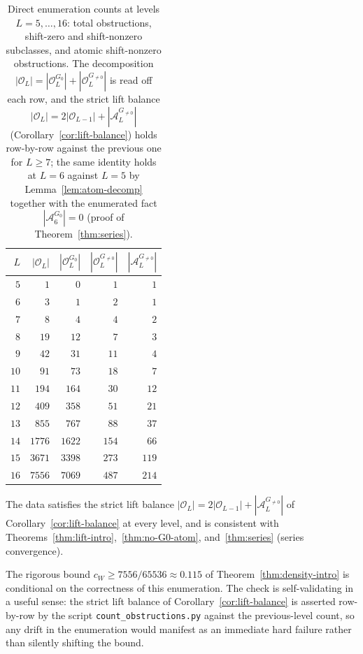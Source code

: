 \documentclass[11pt,reqno]{amsart}
\theoremstyle{plain}
\theoremstyle{definition}
\theoremstyle{remark}
\newcommand{\Obs}{\mathcal{O}}
\newcommand{\Atom}{\mathcal{A}}
\begin{document}
\begin{table}[h]
\centering
\begin{tabular}{rrrrr}
\toprule
$L$ & $|\Obs_L|$ & $|\Obs_L^{G_0}|$ & $|\Obs_L^{G_{\ne 0}}|$ & $|\Atom_L^{G_{\ne 0}}|$ \\
\midrule
$5$  & $1$    & $0$    & $1$   & $1$   \\
$6$  & $3$    & $1$    & $2$   & $1$   \\
$7$  & $8$    & $4$    & $4$   & $2$   \\
$8$  & $19$   & $12$   & $7$   & $3$   \\
$9$  & $42$   & $31$   & $11$  & $4$   \\
$10$ & $91$   & $73$   & $18$  & $7$   \\
$11$ & $194$  & $164$  & $30$  & $12$  \\
$12$ & $409$  & $358$  & $51$  & $21$  \\
$13$ & $855$  & $767$  & $88$  & $37$  \\
$14$ & $1776$ & $1622$ & $154$ & $66$  \\
$15$ & $3671$ & $3398$ & $273$ & $119$ \\
$16$ & $7556$ & $7069$ & $487$ & $214$ \\
\bottomrule
\end{tabular}
\caption{Direct enumeration counts at levels $L=5,\dots,16$: total obstructions, shift-zero and shift-nonzero subclasses, and atomic shift-nonzero obstructions. The decomposition $|\Obs_L| = |\Obs_L^{G_0}| + |\Obs_L^{G_{\ne 0}}|$ is read off each row, and the strict lift balance $|\Obs_L| = 2|\Obs_{L-1}| + |\Atom_L^{G_{\ne 0}}|$ (Corollary~\ref{cor:lift-balance}) holds row-by-row against the previous one for $L \ge 7$; the same identity holds at $L = 6$ against $L = 5$ by Lemma~\ref{lem:atom-decomp} together with the enumerated fact $|\Atom_6^{G_0}| = 0$ (proof of Theorem~\ref{thm:series}).}
\label{tab:appendix-counts}
\end{table}

The data satisfies the strict lift balance $|\Obs_L| = 2 |\Obs_{L-1}| + |\Atom_L^{G_{\ne 0}}|$
of Corollary~\ref{cor:lift-balance} at every level, and is consistent with
Theorems~\ref{thm:lift-intro},~\ref{thm:no-G0-atom}, and~\ref{thm:series}
(series convergence).

The rigorous bound $c_W \ge 7556/65536 \approx 0.115$ of
Theorem~\ref{thm:density-intro} is conditional on the correctness of this
enumeration. The check is self-validating in a useful sense: the
strict lift balance of Corollary~\ref{cor:lift-balance} is asserted
row-by-row by the script \texttt{count\_obstructions.py} against the
previous-level count, so any drift in the enumeration would manifest as
an immediate hard failure rather than silently shifting the bound.



\end{document}
